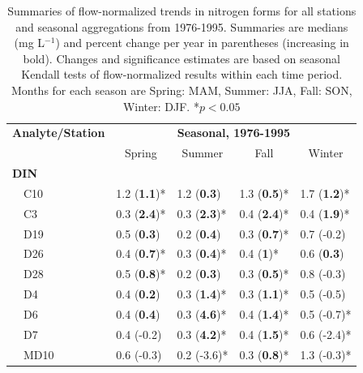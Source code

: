 \documentclass[letterpaper,12pt,oneside]{article}\usepackage[]{graphicx}\usepackage[]{color}
\begin{document}
\begin{table}[!tbp]
\caption{Summaries of flow-normalized trends in nitrogen forms for all stations and seasonal aggregations from 1976-1995. Summaries are  medians (mg L$^{-1}$) and percent change per year in parentheses (increasing in bold). Changes and significance estimates are based on seasonal Kendall tests of flow-normalized results within each time period. Months for each season are Spring: MAM, Summer: JJA, Fall: SON, Winter: DJF. *$p<0.05$\label{tab:trndsbef}} 
\begin{center}
\begin{tabular}{lllll}
\hline\hline
\multicolumn{1}{l}{\bfseries Analyte/Station}&\multicolumn{4}{c}{\bfseries Seasonal, 1976-1995}\tabularnewline
\cline{2-5}
\multicolumn{1}{l}{}&\multicolumn{1}{c}{Spring}&\multicolumn{1}{c}{Summer}&\multicolumn{1}{c}{Fall}&\multicolumn{1}{c}{Winter}\tabularnewline
\hline
{\bfseries DIN}&&&&\tabularnewline
~~C10&1.2 \footnotesize{(\textbf{1.1})*}&1.2 \footnotesize{(\textbf{0.3})}&1.3 \footnotesize{(\textbf{0.5})*}&1.7 \footnotesize{(\textbf{1.2})*}\tabularnewline
~~C3&0.3 \footnotesize{(\textbf{2.4})*}&0.3 \footnotesize{(\textbf{2.3})*}&0.4 \footnotesize{(\textbf{2.4})*}&0.4 \footnotesize{(\textbf{1.9})*}\tabularnewline
~~D19&0.5 \footnotesize{(\textbf{0.3})}&0.2 \footnotesize{(\textbf{0.4})}&0.3 \footnotesize{(\textbf{0.7})*}&0.7 \footnotesize{(-0.2)}\tabularnewline
~~D26&0.4 \footnotesize{(\textbf{0.7})*}&0.3 \footnotesize{(\textbf{0.4})*}&0.4 \footnotesize{(\textbf{1})*}&0.6 \footnotesize{(\textbf{0.3})}\tabularnewline
~~D28&0.5 \footnotesize{(\textbf{0.8})*}&0.2 \footnotesize{(\textbf{0.3})}&0.3 \footnotesize{(\textbf{0.5})*}&0.8 \footnotesize{(-0.3)}\tabularnewline
~~D4&0.4 \footnotesize{(\textbf{0.2})}&0.3 \footnotesize{(\textbf{1.4})*}&0.3 \footnotesize{(\textbf{1.1})*}&0.5 \footnotesize{(-0.5)}\tabularnewline
~~D6&0.4 \footnotesize{(\textbf{0.4})}&0.3 \footnotesize{(\textbf{4.6})*}&0.4 \footnotesize{(\textbf{1.4})*}&0.5 \footnotesize{(-0.7)*}\tabularnewline
~~D7&0.4 \footnotesize{(-0.2)}&0.3 \footnotesize{(\textbf{4.2})*}&0.4 \footnotesize{(\textbf{1.5})*}&0.6 \footnotesize{(-2.4)*}\tabularnewline
~~MD10&0.6 \footnotesize{(-0.3)}&0.2 \footnotesize{(-3.6)*}&0.3 \footnotesize{(\textbf{0.8})*}&1.3 \footnotesize{(-0.3)*}\tabularnewline

\end{tabular}
\end{center}
\end{table}
\end{document}
